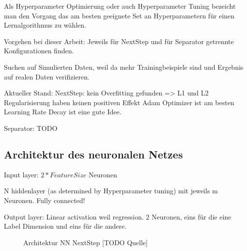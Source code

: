 Als Hyperparameter Optimierung oder auch Hyperparameter Tuning bezeicht man den Vorgang das am besten geeignete Set an 
Hyperparametern für einen Lernalgorithmus zu wählen.


Vorgehen bei dieser Arbeit: Jeweils für NextStep und für Separator getrennte Konfigurationen finden.

Suchen auf Simulierten Daten, weil da mehr Trainingbeispiele sind und Ergebnis auf realen Daten verifizieren.



Aktueller Stand:
NextStep: kein Overfitting gefunden => L1 und L2 Regularisierung haben keinen positiven Effekt
Adam Optimizer ist am besten
Learning Rate Decay ist eine gute Idee. 

Separator: TODO

\subsection{Architektur des neuronalen Netzes}

Input layer: $2 * FeatureSize$ Neuronen

N hiddenlayer (as determined by Hyperparameter tuning) mit jeweils m Neuronen.
Fully connected!

Output layer:
Linear activation weil regression.
2 Neuronen, eins für die eine Label Dimension und eins für die andere.

\begin{figure}
	\caption{Architektur NN NextStep [TODO Quelle]}
	\label{fig:netArchitecture}
\end{figure}
